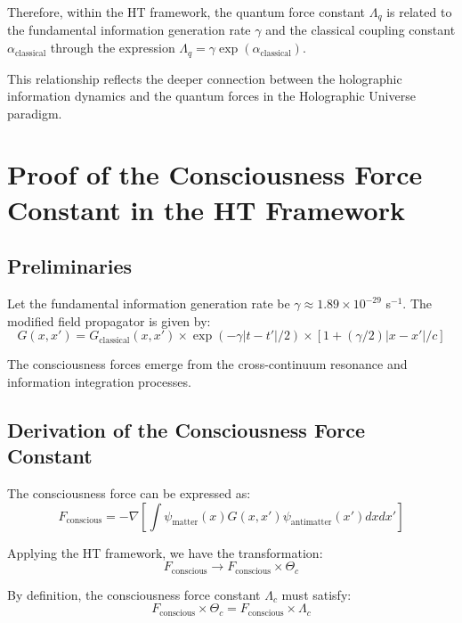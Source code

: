 \documentclass{article}
\theoremstyle{plain}
\theoremstyle{definition}
\theoremstyle{remark}
\begin{document}
Therefore, within the HT framework, the quantum force constant $\Lambda_q$ is related to the fundamental information generation rate $\gamma$ and the classical coupling constant $\alpha_\text{classical}$ through the expression $\Lambda_q = \gamma \exp(\alpha_\text{classical})$.

This relationship reflects the deeper connection between the holographic information dynamics and the quantum forces in the Holographic Universe paradigm.
\section{Proof of the Consciousness Force Constant in the HT Framework}

\subsection{Preliminaries}

Let the fundamental information generation rate be $\gamma \approx 1.89 \times 10^{-29}$ s$^{-1}$. The modified field propagator is given by:
\begin{equation}
G(x,x') = G_\text{classical}(x,x') \times \exp(-\gamma|t-t'|/2) \times \left[1 + (\gamma/2)|x-x'|/c\right]
\end{equation}

The consciousness forces emerge from the cross-continuum resonance and information integration processes.

\subsection{Derivation of the Consciousness Force Constant}

The consciousness force can be expressed as:
\begin{equation}
F_\text{conscious} = -\nabla \left[\int \psi_\text{matter}(x) G(x,x') \psi_\text{antimatter}(x') dx dx'\right]
\end{equation}

Applying the HT framework, we have the transformation:
\begin{equation}
F_\text{conscious} \rightarrow F_\text{conscious} \times \Theta_c
\end{equation}

By definition, the consciousness force constant $\Lambda_c$ must satisfy:
\begin{equation}
F_\text{conscious} \times \Theta_c = F_\text{conscious} \times \Lambda_c
\end{equation}
\end{document}
